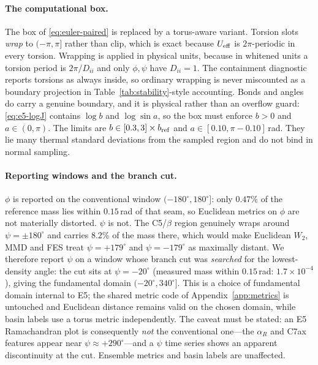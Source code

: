 \documentclass[11pt]{article}
\begin{document}
\paragraph{The computational box.}
The box of \eqref{eq:euler-paired} is replaced by a torus-aware variant.
Torsion slots \emph{wrap} to $(-\pi,\pi]$ rather than clip, which is exact
because $U_{\rm eff}$ is $2\pi$-periodic in every torsion.  Wrapping is applied
in physical units, because in whitened units a torsion period is $2\pi/D_{ii}$
and only $\phi,\psi$ have $D_{ii}=1$.  The containment diagnostic reports
torsions as always inside, so ordinary wrapping is never miscounted as a
boundary projection in Table~\ref{tab:stability}-style accounting.  Bonds and
angles do carry a genuine boundary, and it is physical rather than an overflow
guard: \eqref{eq:e5-logJ} contains $\log b$ and $\log\sin a$, so the box must
enforce $b>0$ and $a\in(0,\pi)$.  The limits are
$b\in[0.3,3]\times b_{\rm ref}$ and $a\in[0.10,\pi-0.10]\,$rad.  They lie many
thermal standard deviations from the sampled region and do not bind in normal
sampling.

\paragraph{Reporting windows and the branch cut.}
$\phi$ is reported on the conventional window $(-180^\circ,180^\circ]$: only
$0.47\%$ of the reference mass lies within $0.15\,$rad of that seam, so
Euclidean metrics on $\phi$ are not materially distorted.  $\psi$ is not.  The
C5/$\beta$ region genuinely wraps around $\psi=\pm180^\circ$ and carries $8.2\%$
of the mass there, which would make Euclidean $W_2$, MMD and FES treat
$\psi=+179^\circ$ and $\psi=-179^\circ$ as maximally distant.  We therefore
report $\psi$ on a window whose branch cut was \emph{searched} for the
lowest-density angle: the cut sits at $\psi=-20^\circ$ (measured mass within
$0.15\,$rad: $1.7\times10^{-4}$), giving the fundamental domain
$(-20^\circ,340^\circ]$.  This is a choice of fundamental domain internal to
E5; the shared metric code of Appendix~\ref{app:metrics} is untouched and
Euclidean distance remains valid on the chosen domain, while basin labels use a
torus metric independently.  The caveat must be stated: an E5 Ramachandran plot
is consequently \emph{not} the conventional one---the $\alpha_R$ and C7ax
features appear near $\psi\approx+290^\circ$---and a $\psi$ time series shows an
apparent discontinuity at the cut.  Ensemble metrics and basin labels are
unaffected.
\end{document}
